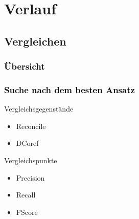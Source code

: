 \documentclass[xcolor=dvipsnames]{beamer}
\begin{document}

\section{Verlauf}


\subsection{Vergleichen}


\begin{frame}[plain]\frametitle{\textcolor{black}{Übersicht}}


\end{frame}

\addtocounter{framenumber}{-1}


\begin{frame}\frametitle{\textcolor{black}{Suche nach dem besten Ansatz}}

\begin{block}{Vergleichsgegenstände}
\begin{itemize}
\item Reconcile
\item DCoref
\end{itemize}
\end{block}

\begin{block}{Vergleichspunkte}
\begin{itemize}
\item Precision
\item Recall
\item FScore
\end{itemize}
\end{block}

\end{frame}

\end{document}
